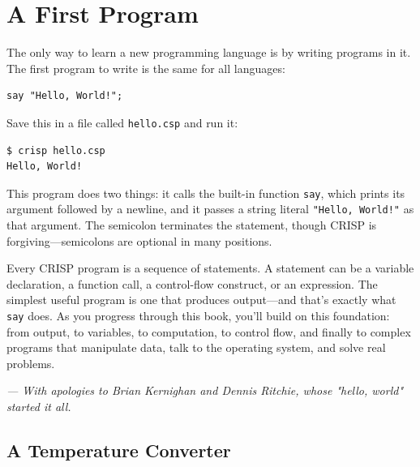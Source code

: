 \section{A First Program}

The only way to learn a new programming language is by writing programs in it. The first program to write is the same for all languages:

\begin{tcolorbox}[colback=codebg, colframe=darkpurple, colbacktitle=darkpurple, title=\textbf{\textcolor{codegold}{Hello, World!}}, fonttitle=\bfseries, sharp corners]
\begin{lstlisting}
say "Hello, World!";
\end{lstlisting}
\end{tcolorbox}

Save this in a file called \texttt{hello.csp} and run it:

\begin{lstlisting}[language=bash]
$ crisp hello.csp
Hello, World!
\end{lstlisting}

This program does two things: it calls the built-in function \texttt{say}, which prints its argument followed by a newline, and it passes a string literal \texttt{"Hello, World!"} as that argument. The semicolon terminates the statement, though CRISP is forgiving—semicolons are optional in many positions.

\begin{tcolorbox}[colback=lightlavender, colframe=softvioletdark, title=\textbf{\textcolor{darkpurple}{Thinking in CRISP: The First Step}}, fonttitle=\bfseries, sharp corners]
Every CRISP program is a sequence of statements. A statement can be a variable declaration, a function call, a control-flow construct, or an expression. The simplest useful program is one that produces output—and that's exactly what \texttt{say} does. As you progress through this book, you'll build on this foundation: from output, to variables, to computation, to control flow, and finally to complex programs that manipulate data, talk to the operating system, and solve real problems.

\textit{--- With apologies to Brian Kernighan and Dennis Ritchie, whose "hello, world" started it all.}
\end{tcolorbox}

\subsection{A Temperature Converter}


